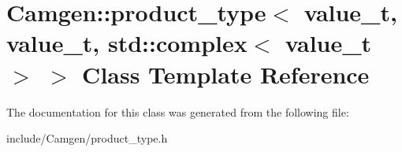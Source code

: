 \hypertarget{a00443}{}\section{Camgen\+:\+:product\+\_\+type$<$ value\+\_\+t, value\+\_\+t, std\+:\+:complex$<$ value\+\_\+t $>$ $>$ Class Template Reference}
\label{a00443}


The documentation for this class was generated from the following file\+:\begin{DoxyCompactItemize}
\item 
include/\+Camgen/product\+\_\+type.\+h\end{DoxyCompactItemize}
